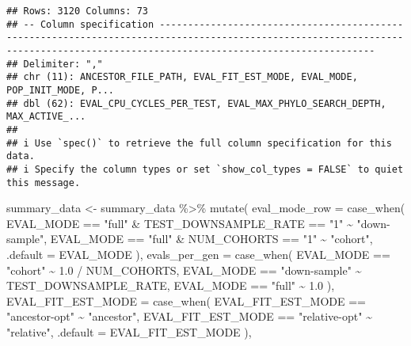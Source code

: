 \documentclass[
]{book}
\newenvironment{Shaded}{\begin{snugshade}}{\end{snugshade}}
\newcommand{\AttributeTok}[1]{\textcolor[rgb]{0.77,0.63,0.00}{#1}}
\newcommand{\FloatTok}[1]{\textcolor[rgb]{0.00,0.00,0.81}{#1}}
\newcommand{\FunctionTok}[1]{\textcolor[rgb]{0.00,0.00,0.00}{#1}}
\newcommand{\NormalTok}[1]{#1}
\newcommand{\OtherTok}[1]{\textcolor[rgb]{0.56,0.35,0.01}{#1}}
\newcommand{\SpecialCharTok}[1]{\textcolor[rgb]{0.00,0.00,0.00}{#1}}
\newcommand{\StringTok}[1]{\textcolor[rgb]{0.31,0.60,0.02}{#1}}
\begin{document}
\begin{verbatim}
## Rows: 3120 Columns: 73
## -- Column specification ----------------------------------------------------------------------------------------------------------------------------------------------------------------------------------
## Delimiter: ","
## chr (11): ANCESTOR_FILE_PATH, EVAL_FIT_EST_MODE, EVAL_MODE, POP_INIT_MODE, P...
## dbl (62): EVAL_CPU_CYCLES_PER_TEST, EVAL_MAX_PHYLO_SEARCH_DEPTH, MAX_ACTIVE_...
## 
## i Use `spec()` to retrieve the full column specification for this data.
## i Specify the column types or set `show_col_types = FALSE` to quiet this message.
\end{verbatim}

\begin{Shaded}
\begin{Highlighting}[]
\NormalTok{summary\_data }\OtherTok{\textless{}{-}}\NormalTok{ summary\_data }\SpecialCharTok{\%\textgreater{}\%}
  \FunctionTok{mutate}\NormalTok{(}
    \AttributeTok{eval\_mode\_row =} \FunctionTok{case\_when}\NormalTok{(}
\NormalTok{      EVAL\_MODE }\SpecialCharTok{==} \StringTok{"full"} \SpecialCharTok{\&}\NormalTok{ TEST\_DOWNSAMPLE\_RATE }\SpecialCharTok{==} \StringTok{"1"} \SpecialCharTok{\textasciitilde{}} \StringTok{"down{-}sample"}\NormalTok{,}
\NormalTok{      EVAL\_MODE }\SpecialCharTok{==} \StringTok{"full"} \SpecialCharTok{\&}\NormalTok{ NUM\_COHORTS }\SpecialCharTok{==} \StringTok{"1"} \SpecialCharTok{\textasciitilde{}} \StringTok{"cohort"}\NormalTok{,}
      \AttributeTok{.default =}\NormalTok{ EVAL\_MODE}
\NormalTok{    ),}
    \AttributeTok{evals\_per\_gen =} \FunctionTok{case\_when}\NormalTok{(}
\NormalTok{      EVAL\_MODE }\SpecialCharTok{==} \StringTok{"cohort"} \SpecialCharTok{\textasciitilde{}} \FloatTok{1.0} \SpecialCharTok{/}\NormalTok{ NUM\_COHORTS,}
\NormalTok{      EVAL\_MODE }\SpecialCharTok{==} \StringTok{"down{-}sample"} \SpecialCharTok{\textasciitilde{}}\NormalTok{ TEST\_DOWNSAMPLE\_RATE,}
\NormalTok{      EVAL\_MODE }\SpecialCharTok{==} \StringTok{"full"} \SpecialCharTok{\textasciitilde{}} \FloatTok{1.0}
\NormalTok{    ),}
    \AttributeTok{EVAL\_FIT\_EST\_MODE =} \FunctionTok{case\_when}\NormalTok{(}
\NormalTok{      EVAL\_FIT\_EST\_MODE }\SpecialCharTok{==} \StringTok{"ancestor{-}opt"} \SpecialCharTok{\textasciitilde{}} \StringTok{"ancestor"}\NormalTok{,}
\NormalTok{      EVAL\_FIT\_EST\_MODE }\SpecialCharTok{==} \StringTok{"relative{-}opt"} \SpecialCharTok{\textasciitilde{}} \StringTok{"relative"}\NormalTok{,}
      \AttributeTok{.default =}\NormalTok{ EVAL\_FIT\_EST\_MODE}
\NormalTok{    ),}

\end{Highlighting}
\end{Shaded}
\end{document}
